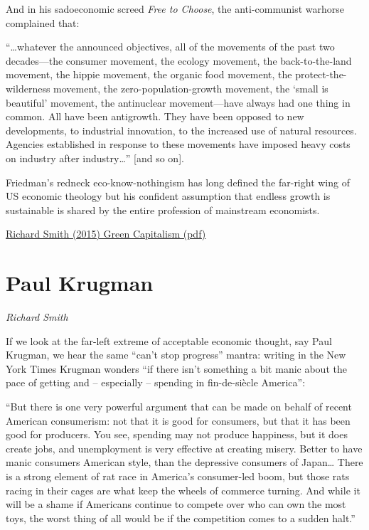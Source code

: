\documentclass[
]{book}
\begin{document}
And in his sadoeconomic screed \emph{Free to Choose}, the anti-communist warhorse
complained that:

``\ldots whatever the announced objectives, all of the movements of
the past two decades---the consumer movement, the ecology
movement, the back-to-the-land movement, the hippie movement,
the organic food movement, the protect-the-wilderness movement,
the zero-population-growth movement, the `small is beautiful'
movement, the antinuclear movement---have always had one thing
in common. All have been antigrowth. They have been opposed to
new developments, to industrial innovation, to the increased use of
natural resources. Agencies established in response to these
movements have imposed heavy costs on industry after
industry\ldots{}'' {[}and so on{]}.

Friedman's redneck eco-know-nothingism has long defined the far-right wing of US
economic theology but his confident assumption that endless growth is sustainable is
shared by the entire profession of mainstream economists.

\href{pdf/Richard_Smith_Green_Capitalism_the_God_that_Failed.pdf}{Richard Smith (2015) Green Capitalism (pdf)}

\hypertarget{paul-krugman}{%
\section{Paul Krugman}\label{paul-krugman}}

\emph{Richard Smith}

If we look at the far-left extreme of acceptable economic
thought, say Paul Krugman, we hear the same ``can't stop progress'' mantra: writing
in the New York Times Krugman wonders ``if there isn't something a bit manic about
the pace of getting and -- especially -- spending in fin-de-siècle America'':

``But there is one very powerful argument that can be made on
behalf of recent American consumerism: not that it is good for
consumers, but that it has been good for producers. You see,
spending may not produce happiness, but it does create jobs, and
unemployment is very effective at creating misery. Better to have
manic consumers American style, than the depressive consumers
of Japan\ldots{} There is a strong element of rat race in America's
consumer-led boom, but those rats racing in their cages are what
keep the wheels of commerce turning. And while it will be a
shame if Americans continue to compete over who can own the
most toys, the worst thing of all would be if the competition comes
to a sudden halt.''
\end{document}
